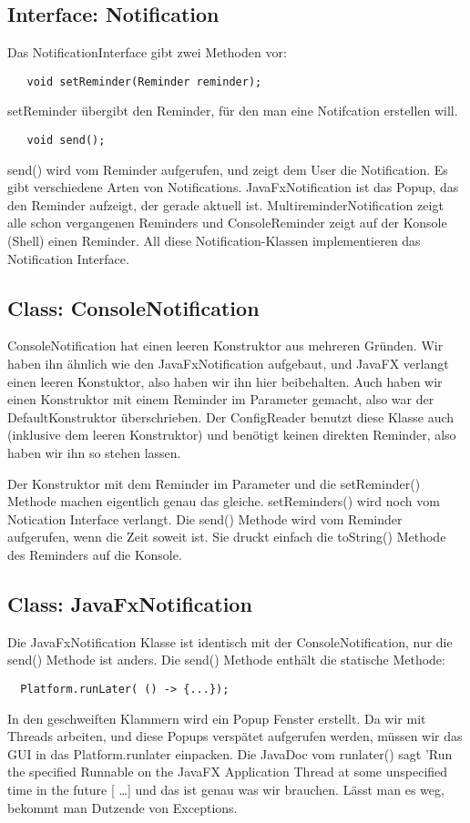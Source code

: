 \subsection{Interface: Notification}
Das NotificationInterface gibt zwei Methoden vor:

\begin{lstlisting}
   void setReminder(Reminder reminder);
\end{lstlisting}
setReminder übergibt den Reminder, für den man eine Notifcation erstellen will.

\begin{lstlisting}
   void send();
\end{lstlisting}
send() wird vom Reminder aufgerufen, und zeigt dem User die Notification. Es gibt verschiedene Arten von Notifications.
JavaFxNotification ist das Popup, das den Reminder aufzeigt, der gerade aktuell ist. MultireminderNotification
zeigt alle schon vergangenen Reminders und ConsoleReminder zeigt auf der Konsole (Shell) einen Reminder.
All diese Notification-Klassen implementieren das Notification Interface.


\subsection{Class: ConsoleNotification}
ConsoleNotification hat einen leeren Konstruktor aus mehreren Gründen. Wir haben ihn ähnlich wie den JavaFxNotification aufgebaut,
und JavaFX verlangt einen leeren Konstuktor, also haben wir ihn hier beibehalten. Auch haben wir einen Konstruktor mit einem Reminder im Parameter gemacht,
also war der DefaultKonstruktor überschrieben.
Der ConfigReader benutzt diese Klasse auch (inklusive dem leeren Konstruktor) und benötigt keinen direkten Reminder, also haben wir ihn so stehen lassen.

Der Konstruktor mit dem Reminder im Parameter und die setReminder() Methode machen eigentlich genau das gleiche. setReminders() wird noch vom Notication Interface verlangt.
Die send() Methode wird vom Reminder aufgerufen, wenn die Zeit soweit ist. Sie druckt einfach die toString() Methode des Reminders auf die Konsole.


\subsection{Class: JavaFxNotification}
Die JavaFxNotification Klasse ist identisch mit der ConsoleNotification, nur die send() Methode ist anders.
Die send() Methode enthält die statische Methode:
\begin{lstlisting}
  Platform.runLater( () -> {...});
\end{lstlisting}
In den geschweiften Klammern wird ein Popup Fenster erstellt. Da wir mit Threads arbeiten, und diese Popups verspätet aufgerufen werden,
müssen wir das GUI in das Platform.runlater einpacken. Die JavaDoc vom runlater() sagt 'Run the specified Runnable on the JavaFX Application
Thread at some unspecified time in the future [ \dots ]
und das ist genau was wir brauchen. Lässt man es weg, bekommt man Dutzende von Exceptions.

